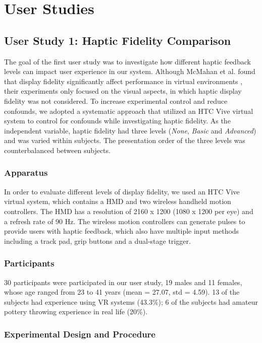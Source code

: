 \documentclass{svjour3}                     %
\begin{document}
\section{User Studies}
\label{sec:study}

\subsection{User Study 1: Haptic Fidelity Comparison}

The goal of the first user study was to investigate how different haptic feedback levels can impact user experience in our system. 
%
Although McMahan et al. found that display fidelity significantly affect performance in virtual environments \cite{mcmahan2012evaluating}, their experiments only focused on the visual aspects, in which haptic display fidelity was not considered.
%
To increase experimental control and reduce confounds, we adopted a systematic approach that utilized an HTC Vive virtual system to control for confounds while investigating haptic fidelity.
%
As the independent variable, haptic fidelity had three levels (\textit{None}, \textit{Basic} and \textit{Advanced}) and was varied within subjects.
%
The presentation order of the three levels was counterbalanced between subjects.


\subsubsection{Apparatus}
In order to evaluate different levels of display fidelity, we used an HTC Vive virtual system, which contains a HMD and two wireless handheld motion controllers.
The HMD has a resolution of 2160 x 1200 (1080 x 1200 per eye) and a refresh rate of 90 Hz.
The wireless motion controllers can generate pulses to provide users with haptic feedback, which also have multiple input methods including a track pad, grip buttons and a dual-stage trigger.

\subsubsection{Participants}
30 participants were participated in our user study, 19 males and 11 females, whose age ranged from 23 to 41 years (mean = 27.07, std = 4.59). 13 of the subjects had experience using VR systems (43.3\%); 6 of the subjects had amateur pottery throwing experience in real life (20\%).

\subsubsection{Experimental Design and Procedure}
\end{document}
